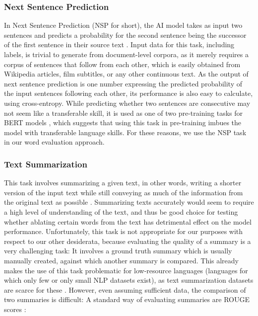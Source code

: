 \subsubsection{Next Sentence Prediction}
In Next Sentence Prediction (NSP for short), the AI model takes as input two sentences and predicts a probability for the second sentence being the successor of the first sentence in their source text \cite{kentonBertPretrainingDeep2019}.
Input data for this task, including labels, is trivial to generate from document-level corpora, as it merely requires a corpus of sentences that follow from each other, which is easily obtained from Wikipedia articles, film subtitles, or any other continuous text.
As the output of next sentence prediction is one number expressing the predicted probability of the input sentences following each other, its performance is also easy to calculate, using cross-entropy.
While predicting whether two sentences are consecutive may not seem like a transferable skill, it is used as one of two pre-training tasks for BERT models \cite{kentonBertPretrainingDeep2019}, which suggests that using this task in pre-training imbues the model with transferable language skills.
For these reasons, we use the NSP task in our word evaluation approach.


\subsubsection{Text Summarization} \label{sec:text-summarization}
This task involves summarizing a given text, in other words, writing a shorter version of the input text while still conveying as much of the information from the original text as possible \cite{radevIntroductionSpecialIssue2002}.
Summarizing texts accurately would seem to require a high level of understanding of the text, and thus be good choice for testing whether ablating certain words from the text has detrimental effect on the model performance.
Unfortunately, this task is not appropriate for our purposes with respect to our other desiderata, because evaluating the quality of a summary is a very challenging task:
It involves a ground truth summary which is usually manually created, against which another summary is compared.
This already makes the use of this task problematic for low-resource languages (languages for which only few or only small NLP datasets exist), as text summarization datasets are scarce for these \cite{dahanStateFateSummarization2025}.
However, even assuming sufficient data, the comparison of two summaries is difficult:
A standard way of evaluating summaries are ROUGE scores \cite{allahyariTextSummarizationTechniques2017}:

